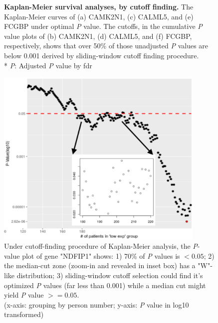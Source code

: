 \documentclass[preprint,12pt]{elsarticle}
\newcommand{\bcaption}[2]{\caption{\textbf{#1} #2}}
\newenvironment{MyColorPar}[1]{%
    \leavevmode\color{#1}\ignorespaces%
}{%
}%
\begin{document}
\begin{MyColorPar}{blue}
\begin{figure}[ht]
\bcaption{Kaplan-Meier survival analyses, by cutoff finding.}
{The Kaplan-Meier curves of (a) CAMK2N1, (c) CALML5, and (e) FCGBP under optimal \textit{P} value. 
The cutoffs, in the cumulative \textit{P} value plots of (b) CAMK2N1, (d) CALML5, and (f) FCGBP, respectively,
shows that over 50\% of those unadjusted \textit{P} values are below 0.001 derived by sliding-window cutoff finding procedure.\\
* \textit{P}: Adjusted \textit{P} value by \acrfull{fdr}
}
\label{fig:figure4}
\end{figure}






\begin{figure}[ht]
    \centering
    \includegraphics[width=10cm]{Rplot_pvaluePlot_NDFIP1.pdf}
    \caption{Under cutoff-finding procedure of Kaplan-Meier analysis, the \textit{P}-value plot of gene "NDFIP1" shows: 1) 70\% of \textit{P} values is $<0.05$; 2) the median-cut zone (zoom-in and revealed in inset box) has a "W"-like distribution; 3) sliding-window cutoff selection could find it's optimized \textit{P} values (far less than 0.001) while a median cut might yield \textit{P} value $>=0.05$.\\
    (x-axis: grouping by person number; y-axis: \textit{P} value in log10 transformed)}
    \label{fig:pvaluePlot_NDFIP1}
\end{figure}


\end{MyColorPar}
\end{document}
